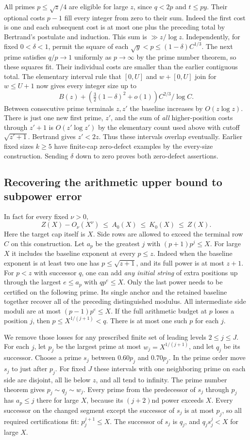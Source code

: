 \documentclass[11pt]{article}
\begin{document}
All primes $p\le\sqrt z/4$ are eligible for large $z$, since $q<2p$ and $t\le py$. Their optional costs $p-1$ fill every integer from zero to their sum. Indeed the first cost is one and each subsequent cost is at most one plus the preceding total by Bertrand's postulate and induction. This sum is $\gg z/\log z$. Independently, for fixed $0<\delta<1$, permit the square of each $\sqrt y<p\le(1-\delta)C^{1/3}$. The next prime satisfies $q/p\to1$ uniformly as $p\to\infty$ by the prime number theorem, so these squares fit. Their individual costs are smaller than the earlier contiguous total. The elementary interval rule that $[0,U]$ and $w+[0,U]$ join for $w\le U+1$ now gives every integer size up to
\[
 B(z)+\left(\tfrac32(1-\delta)^2+o(1)\right)C^{2/3}/\log C.
\]
Between consecutive prime terminals $z,z'$ the baseline increases by $O(z\log z)$. There is just one new first prime, $z'$, and the sum of \emph{all} higher-position costs through $z'+1$ is $O(z'\log z')$ by the elementary count used above with cutoff $\sqrt{z'+1}$. Bertrand gives $z'<2z$. Thus these intervals overlap eventually. Earlier fixed sizes $k\ge5$ have finite-cap zero-defect examples by the every-size construction. Sending $\delta$ down to zero proves both zero-defect assertions.

\subsection*{Recovering the arithmetic upper bound to subpower error}
In fact for every fixed $\nu>0$,
\[
 Z(X)-O_\nu(X^\nu)\ \le\ A_0(X)\ \le\ K_0(X)\ \le\ Z(X).
 \tag{1}
\]
Here the target cap itself is $X$. Side rows are allowed to exceed the terminal row $C$ on this construction. Let $a_p$ be the greatest $j$ with $(p+1)p^j\le X$. For large $X$ it includes the baseline exponent at every $p\le z$. Indeed when the baseline exponent is at least two one has $p\le\sqrt{z+1}$, and its full power is at most $z+1$. For $p<z$ with successor $q$, one can add \emph{any initial string} of extra positions up through the largest $e\le a_p$ with $q p^e\le X$. Only the last power needs to be certified on the following prime. Its single anchor and the retained baseline together recover all of the preceding distinguished modulus. All intermediate side moduli are at most $(p-1)p^e\le X$. If the full arithmetic budget at $p$ loses a position $j$, then $p\le X^{1/(j+1)}<q$. There is at most one such $p$ for each $j$.

We remove those losses for any prescribed finite set of leading levels $2\le j\le J$. For each $j$, let $p_j$ be the largest prime at most $w_j=X^{1/(j+1)}$, and let $q_j$ be its successor. Choose a prime $s_j$ between $0.60p_j$ and $0.70p_j$. In the prime order move $s_j$ to just after $p_j$. For fixed $J$ these intervals with one neighboring prime on each side are disjoint, all lie below $z$, and all tend to infinity. The prime number theorem gives $p_j\sim q_j\sim w_j$. Every prime from the predecessor of $s_j$ through $p_j$ has $a_p\le j$ there for large $X$, because its $(j+2)$nd power exceeds $X$. Every successor on the changed segment except the successor of $s_j$ is at most $p_j$, so all required certifications fit: $p_j^{j+1}\le X$. The successor of $s_j$ is $q_j$, and $q_j s_j^j<X$ for large $X$.
\end{document}
